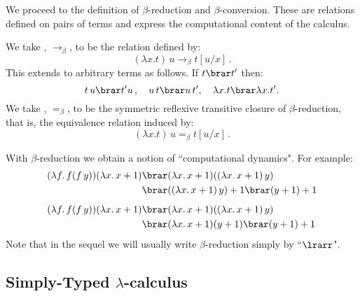 \documentclass[12pt]{article}
\begin{document}
%
%
%
We proceed to the definition of $\beta$-reduction and $\beta$-conversion. These are relations defined on pairs of terms and express the
computational content of the calculus.
%
\begin{mydefinition}
We take , $\longrightarrow_\beta$, to be the relation defined by: %
\[ (\lambda x. t)\,u \longrightarrow_\beta t[u/x]\,. \]
This extends to arbitrary terms as follows. If $t\brar t'$ then:
\[ t\,u\brar t'u\,,\quad u\,t\brar u\,t',\quad \lambda x.t\brar\lambda x.t'.\]
We take , $=_\beta$, to be the symmetric reflexive transitive closure of $\beta$-reduction, that is, the
equivalence relation induced by:
\[ (\lambda x.t)\,u =_\beta t[u/x]\,. \]\deq[-1]
\end{mydefinition}
%
With $\beta$-reduction we obtain a notion of ``computational dynamics". For example:
\begin{align*}
(\lambda f.\,f(f\,y))(\lambda x.\,x+1) &\brar (\lambda x.\,x+1)((\lambda x.\,x+1)\,y) \\
    &\brar((\lambda x.\,x+1)\,y)+1\brar(y+1)+1 \\[5pt]
(\lambda f.\,f(f\,y))(\lambda x.\,x+1) &\brar (\lambda x.\,x+1)((\lambda x.\,x+1)\,y) \\
    &\brar(\lambda x.\,x+1)(y+1)\brar(y+1)+1
\end{align*}
Note that in the sequel we will usually write $\beta$-reduction simply by ``$\lrarr$".

\subsection{Simply-Typed $\lambda$-calculus}
\end{document}
